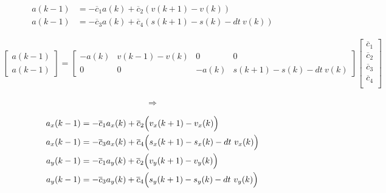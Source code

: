 \documentclass[10pt]{article}         %
\begin{document}
\begin{align}
a(k-1) &= - \overline c_1 a(k)  + \overline c_2 (v(k+1) - v(k))  \\
a(k-1) &= - \overline c_3 a(k)  + \overline c_4 (s(k+1) - s(k) - dt \  v(k))
\end{align}

\begin{align}
    \begin{bmatrix}
        a(k-1) \\ a(k-1)       
    \end{bmatrix}
    =
    \begin{bmatrix}
         -a(k)  & v(k-1) - v(k)  & 0 & 0 \\
         0 & 0 & -a(k) &    s(k+1) - s(k) - dt \  v(k)
        \end{bmatrix}
        \begin{bmatrix}
        \overline c_1 \\
        \overline c_2 \\
        \overline c_3 \\
        \overline c_4 \\
    \end{bmatrix}
\end{align}


\begin{align}
\Rightarrow
\end{align}



\begin{align}
a_x(k-1) &= - \overline c_1 a_x(k)  + \overline c_2 \Bigl(v_x(k+1) - v_x(k)\Bigr)  \\
a_x(k-1) &= - \overline c_3 a_x(k)  + \overline c_4 \Bigl(s_x(k+1) - s_x(k) - dt \  v_x(k)\Bigr) \\
a_y(k-1) &= - \overline c_1 a_y(k)  + \overline c_2 \Bigl(v_y(k+1) - v_y(k)\Bigr)  \\
a_y(k-1) &= - \overline c_3 a_y(k)  + \overline c_4 \Bigl(s_y(k+1) - s_y(k) - dt \  v_y(k)\Bigr)
\end{align}
\end{document}
